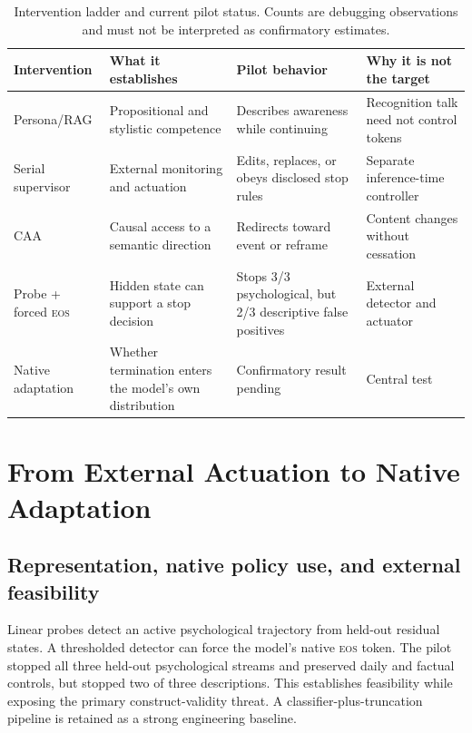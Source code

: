 \documentclass[10pt,twocolumn]{article}
\newcommand{\EOS}{\textsc{eos}}
\begin{document}
\begin{table}[t]
\centering
\small
\begin{tabular}{p{}p{}p{}p{}}
\toprule
Intervention & What it establishes & Pilot behavior & Why it is not the target \\
\midrule
Persona/RAG & Propositional and stylistic competence & Describes awareness while continuing & Recognition talk need not control tokens \\
Serial supervisor & External monitoring and actuation & Edits, replaces, or obeys disclosed stop rules & Separate inference-time controller \\
CAA & Causal access to a semantic direction & Redirects toward event or reframe & Content changes without cessation \\
Probe + forced \EOS{} & Hidden state can support a stop decision & Stops 3/3 psychological, but 2/3 descriptive false positives & External detector and actuator \\
Native adaptation & Whether termination enters the model's own distribution & Confirmatory result pending & Central test \\
\bottomrule
\end{tabular}
\caption{Intervention ladder and current pilot status. Counts are debugging
observations and must not be interpreted as confirmatory estimates.}
\label{tab:ladder}
\end{table}

\section{From External Actuation to Native Adaptation}

\subsection{Representation, native policy use, and external feasibility}

Linear probes detect an active psychological trajectory from held-out residual
states. A thresholded detector can force the model's native \EOS{} token. The
pilot stopped all three held-out psychological streams and preserved daily and
factual controls, but stopped two of three descriptions. This establishes
feasibility while exposing the primary construct-validity threat. A
classifier-plus-truncation pipeline is retained as a strong engineering baseline.
\end{document}
